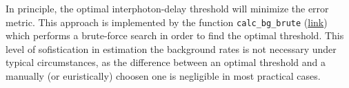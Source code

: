 In principle, the optimal interphoton-delay threshold will minimize
the error metric. This approach is implemented by the function \verb|calc_bg_brute|
(\href{http://fretbursts.readthedocs.org/en/latest/plugins.html#fretbursts.burstlib\_ext.calc\_bg\_brute}{link}) which performs a brute-force search in order to find the optimal threshold.
This level of sofistication in estimation the background rates is not
necessary under typical circumstances, as the difference between an optimal threshold
and a manually (or euristically) choosen one is negligible in most practical cases.
